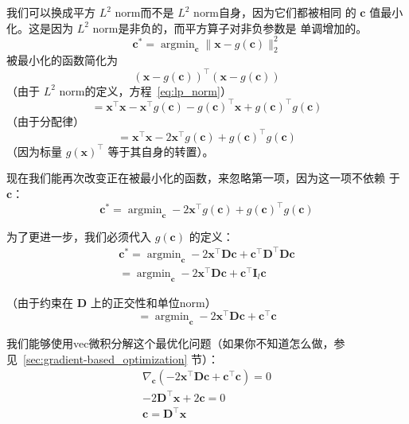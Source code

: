 我们可以换成平方 $L^2$ \gls*{norm}而不是 $L^2$ \gls*{norm}自身，因为它们都被相同
的 $\pmb{c}$ 值最小化。这是因为 $L^2$ \gls*{norm}是非负的，而平方算子对非负参数是
单调增加的。
\begin{equation}
  \pmb{c}^* = \mathop{\arg\min}_{\pmb{c}}\|\pmb{x} - g(\pmb{c})\|^2_2
\end{equation}
被最小化的函数简化为
\begin{equation}
  (\pmb{x} - g(\pmb{c}))^{\top}(\pmb{x} - g(\pmb{c}))
\end{equation}
（由于 $L^2$ \gls*{norm}的定义，方程~\ref{eq:lp_norm}）
\begin{equation}
  = \pmb{x}^{\top}\pmb{x} - \pmb{x}^{\top}g(\pmb{c}) - g(\pmb{c})^{\top}\pmb{x}
  + g(\pmb{c})^{\top}g(\pmb{c})
\end{equation}
（由于分配律）
\begin{equation}
  = \pmb{x}^{\top}\pmb{x} - 2\pmb{x}^{\top}g(\pmb{c}) +
  g(\pmb{c})^{\top}g(\pmb{c})
\end{equation}
（因为标量 $g(\pmb{x})^{\top}$ 等于其自身的转置）。

现在我们能再次改变正在被最小化的函数，来忽略第一项，因为这一项不依赖
于 $\pmb{c}$：
\begin{equation}
  \pmb{c}^* = \mathop{\arg\min}_{\pmb{c}} - 2\pmb{x}^{\top}g(\pmb{c}) +
    g(\pmb{c})^{\top}g(\pmb{c})
\end{equation}

为了更进一步，我们必须代入 $g(\pmb{c})$ 的定义：
\begin{gather}
  \pmb{c}^* = \mathop{\arg\min}_{\pmb{c}}-2\pmb{x}^{\top}\pmb{D}\pmb{c} +
  \pmb{c}^{\top}\pmb{D}^{\top}\pmb{D}\pmb{c}\\
  = \mathop{\arg\min}_{\pmb{c}}-2\pmb{x}^{\top}\pmb{D}\pmb{c} +
  \pmb{c}^{\top}\pmb{I}_l\pmb{c}
\end{gather}

（由于约束在 $\pmb{D}$ 上的正交性和单位\gls*{norm}）
\begin{equation}
  = \mathop{\arg\min}_{\pmb{c}}-2\pmb{x}^{\top}\pmb{D}\pmb{c} +
  \pmb{c}^{\top}\pmb{c}
\end{equation}

我们能够使用\gls*{vec}微积分解这个最优化问题（如果你不知道怎么做，参
见~\ref{sec:gradient-based_optimization} 节）：
\begin{gather}
  \nabla_{\pmb{c}}(-2\pmb{x}^{\top}\pmb{D}\pmb{c} + \pmb{c}^{\top}\pmb{c}) = 0\\
  -2\pmb{D}^{\top}\pmb{x} + 2\pmb{c} = 0\\
  \pmb{c} = \pmb{D}^{\top}\pmb{x}
\end{gather}

